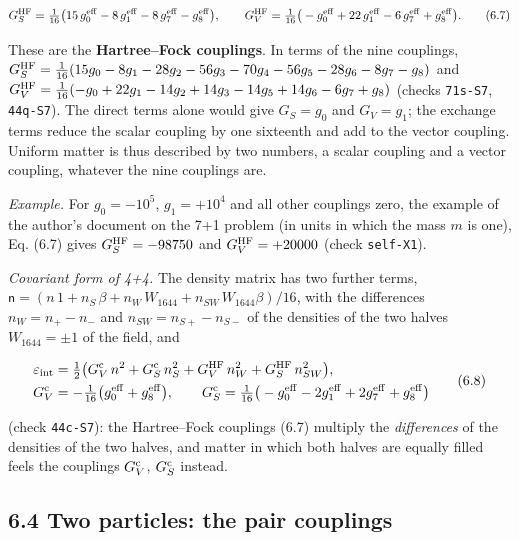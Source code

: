 \documentclass[
  10pt,
]{article}
\begin{document}
\[G_S^{\rm HF}=\tfrac1{16}\big(15\,g_0^{\rm eff}-8\,g_1^{\rm eff}-8\,g_7^{\rm eff}-g_8^{\rm eff}\big),\qquad
G_V^{\rm HF}=\tfrac1{16}\big(-g_0^{\rm eff}+22\,g_1^{\rm eff}-6\,g_7^{\rm eff}+g_8^{\rm eff}\big).\tag{6.7}\]

These are the \textbf{Hartree--Fock couplings}. In terms of the nine
couplings,
\(G_S^{\rm HF}=\tfrac1{16}(15g_0-8g_1-28g_2-56g_3-70g_4-56g_5-28g_6-8g_7-g_8)\)
and
\(G_V^{\rm HF}=\tfrac1{16}(-g_0+22g_1-14g_2+14g_3-14g_5+14g_6-6g_7+g_8)\)
(checks \texttt{71s-S7}, \texttt{44q-S7}). The direct terms alone would
give \(G_S=g_0\) and \(G_V=g_1\); the exchange terms reduce the scalar
coupling by one sixteenth and add to the vector coupling. Uniform matter
is thus described by two numbers, a scalar coupling and a vector
coupling, whatever the nine couplings are.

\emph{Example.} For \(g_0=-10^5\), \(g_1=+10^4\) and all other couplings
zero, the example of the author's document on the 7+1 problem (in units
in which the mass \(m\) is one), Eq. (6.7) gives \(G_S^{\rm HF}=-98750\)
and \(G_V^{\rm HF}=+20000\) (check \texttt{self-X1}).

\emph{Covariant form of 4+4.} The density matrix has two further terms,
\(\mathsf n=(n\,1+n_S\,\beta+n_W\,W_{1644}+n_{SW}\,W_{1644}\beta)/16\),
with the differences \(n_W=n_+-n_-\) and \(n_{SW}=n_{S+}-n_{S-}\) of the
densities of the two halves \(W_{1644}=\pm1\) of the field, and

\[\begin{aligned}
\varepsilon_{\rm int}&=\tfrac12\big(G_V^{\rm c}\,n^2+G_S^{\rm c}\,n_S^2+G_V^{\rm HF}\,n_W^2+G_S^{\rm HF}\,n_{SW}^2\big),\\
G_V^{\rm c}&=-\tfrac1{16}\big(g_0^{\rm eff}+g_8^{\rm eff}\big),\qquad
G_S^{\rm c}=\tfrac1{16}\big(-g_0^{\rm eff}-2g_1^{\rm eff}+2g_7^{\rm eff}+g_8^{\rm eff}\big)
\end{aligned}\tag{6.8}\]

(check \texttt{44c-S7}): the Hartree--Fock couplings (6.7) multiply the
\emph{differences} of the densities of the two halves, and matter in
which both halves are equally filled feels the couplings
\(G_V^{\rm c}\), \(G_S^{\rm c}\) instead.

\hypertarget{two-particles-the-pair-couplings}{%
\subsection{6.4 Two particles: the pair
couplings}\label{two-particles-the-pair-couplings}}
\end{document}

